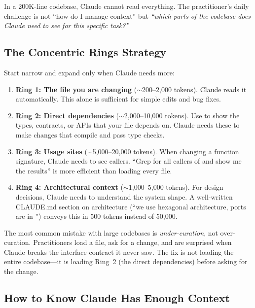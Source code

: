 In a 200K-line codebase, Claude cannot read everything.
The practitioner's daily challenge is not ``how do I manage context''
but \emph{``which parts of the codebase does Claude need to see
for this specific task?''}

\subsection*{The Concentric Rings Strategy}

Start narrow and expand only when Claude needs more:

\begin{enumerate}
  \item \textbf{Ring 1: The file you are changing} ($\sim$200--2{,}000 tokens).
    Claude reads it automatically. This alone is sufficient for
    simple edits and bug fixes.

  \item \textbf{Ring 2: Direct dependencies} ($\sim$2{,}000--10{,}000 tokens).
    Use  to show the types, contracts,
    or APIs that your file depends on. Claude needs these to make
    changes that compile and pass type checks.

  \item \textbf{Ring 3: Usage sites} ($\sim$5{,}000--20{,}000 tokens).
    When changing a function signature, Claude needs to see callers.
    ``Grep for all callers of  and show me the results''
    is more efficient than loading every file.

  \item \textbf{Ring 4: Architectural context} ($\sim$1{,}000--5{,}000 tokens).
    For design decisions, Claude needs to understand the system shape.
    A well-written CLAUDE.md section on architecture
    (``we use hexagonal architecture, ports are in '')
    conveys this in 500 tokens instead of 50{,}000.
\end{enumerate}

\begin{keyinsight}
The most common mistake with large codebases is \emph{under-curation},
not over-curation. Practitioners load a file, ask for a change, and are
surprised when Claude breaks the interface contract it never saw.
The fix is not loading the entire codebase---it is loading Ring~2
(the direct dependencies) before asking for the change.
\end{keyinsight}

\subsection*{How to Know Claude Has Enough Context}

